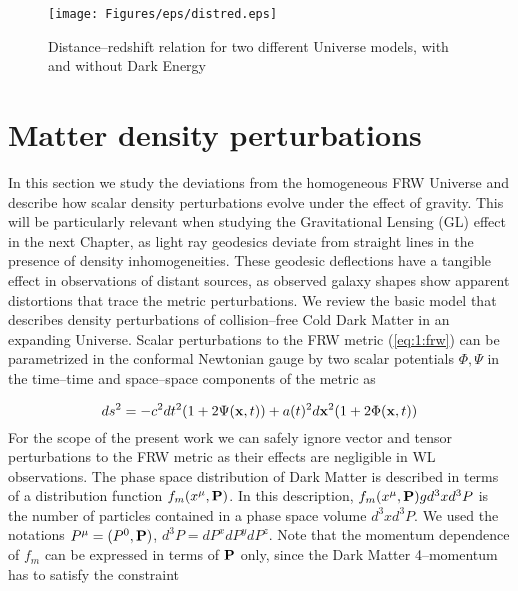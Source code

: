 \begin{figure}
\begin{center}
\texttt{[image: Figures/eps/distred.eps]}
\end{center}
\caption{Distance--redshift relation for two different Universe models, with and without Dark Energy}
\label{fig:1:distred}
\end{figure}    


\section{Matter density perturbations}
\label{sec:1:density-pert}
In this section we study the deviations from the homogeneous FRW Universe and describe how scalar density perturbations evolve under the effect of gravity. This will be particularly relevant when studying the Gravitational Lensing (GL) effect in the next Chapter, as light ray geodesics deviate from straight lines in the presence of density inhomogeneities. These geodesic deflections have a tangible effect in observations of distant sources, as observed galaxy shapes show apparent distortions that trace the metric perturbations. We review the basic model that describes density perturbations of collision--free Cold Dark Matter in an expanding Universe. Scalar perturbations to the FRW metric (\ref{eq:1:frw}) can be parametrized in the conformal Newtonian gauge \citep{Dodelson-C4} by two scalar potentials $\Phi,\Psi$ in the time--time and space--space components of the metric as 

\begin{equation}
\label{eq:1:confnewt}
ds^2 = -c^2dt^2(1+2\Psi(\mathbf{x},t)) + a(t)^2d\mathbf{x}^2(1+2\Phi(\mathbf{x},t))
\end{equation}
%
For the scope of the present work we can safely ignore vector and tensor perturbations to the FRW metric as their effects are negligible in WL observations. The phase space distribution of Dark Matter is described in terms of a distribution function $f_m(x^\mu,\mathbf{P})$. In this description, $f_m(x^\mu,\mathbf{P})g d^3x d^3P$ is the number of particles contained in a phase space volume $d^3x d^3P$. We used the notations $P^\mu=(P^0,\mathbf{P})$, $d^3 P = dP^x dP^y dP^z$. Note that the momentum dependence of $f_m$ can be expressed in terms of $\mathbf{P}$ only, since the Dark Matter 4--momentum has to satisfy the constraint

